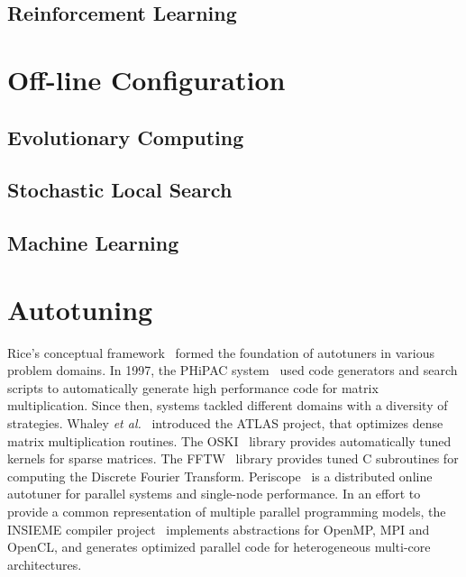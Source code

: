 \subsection{Reinforcement Learning}
\label{subsec:reinforce}

\section{Off-line Configuration}
\label{sec:offconfig}

\subsection{Evolutionary Computing}
\label{subsec:evolcomp}

\subsection{Stochastic Local Search}
\label{subsec:searchsls}

\subsection{Machine Learning}
\label{subsec:searchml}

\section{Autotuning}
\label{chap:autotuning}

Rice's conceptual framework~\cite{rice1976algorithm} formed the foundation
of autotuners in various problem domains.  In 1997, the PHiPAC
system~\cite{bilmes1997optimizing} used code generators and search scripts to
automatically generate high performance code
for matrix multiplication. Since then, systems tackled different domains with a
diversity of strategies. Whaley \emph{et al.}~\cite{dongarra1998automatically}
introduced the ATLAS project, that optimizes dense matrix multiplication
routines. The OSKI~\cite{vuduc2005oski} library provides automatically tuned
kernels for sparse matrices. The FFTW~\cite{frigo1998fftw} library provides
tuned C subroutines for computing the Discrete Fourier Transform.
Periscope~\cite{gerndt2010automatic} is a distributed online autotuner for
parallel systems and single-node performance.  In an effort to provide a common
representation of multiple parallel programming models, the INSIEME compiler
project~\cite{jordan2012multi} implements abstractions for OpenMP, MPI and
OpenCL, and generates optimized parallel code for heterogeneous multi-core
architectures.

